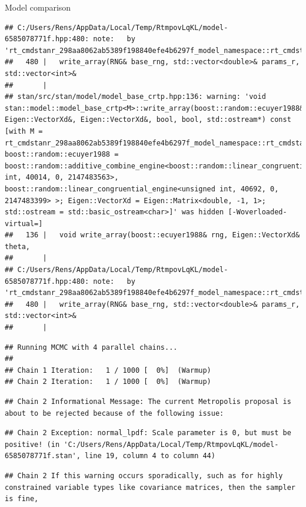 \documentclass[
  ignorenonframetext,
]{beamer}
\begin{document}
\begin{frame}[fragile]{Model comparison}
\begin{verbatim}
## C:/Users/Rens/AppData/Local/Temp/RtmpovLqKL/model-6585078771f.hpp:480: note:   by 'rt_cmdstanr_298aa8062ab5389f198840efe4b6297f_model_namespace::rt_cmdstanr_298aa8062ab5389f198840efe4b6297f_model::write_array'
##   480 |   write_array(RNG& base_rng, std::vector<double>& params_r, std::vector<int>&
##       | 
## stan/src/stan/model/model_base_crtp.hpp:136: warning: 'void stan::model::model_base_crtp<M>::write_array(boost::random::ecuyer1988&, Eigen::VectorXd&, Eigen::VectorXd&, bool, bool, std::ostream*) const [with M = rt_cmdstanr_298aa8062ab5389f198840efe4b6297f_model_namespace::rt_cmdstanr_298aa8062ab5389f198840efe4b6297f_model; boost::random::ecuyer1988 = boost::random::additive_combine_engine<boost::random::linear_congruential_engine<unsigned int, 40014, 0, 2147483563>, boost::random::linear_congruential_engine<unsigned int, 40692, 0, 2147483399> >; Eigen::VectorXd = Eigen::Matrix<double, -1, 1>; std::ostream = std::basic_ostream<char>]' was hidden [-Woverloaded-virtual=]
##   136 |   void write_array(boost::ecuyer1988& rng, Eigen::VectorXd& theta,
##       | 
## C:/Users/Rens/AppData/Local/Temp/RtmpovLqKL/model-6585078771f.hpp:480: note:   by 'rt_cmdstanr_298aa8062ab5389f198840efe4b6297f_model_namespace::rt_cmdstanr_298aa8062ab5389f198840efe4b6297f_model::write_array'
##   480 |   write_array(RNG& base_rng, std::vector<double>& params_r, std::vector<int>&
##       |
\end{verbatim}

\begin{verbatim}
## Running MCMC with 4 parallel chains...
## 
## Chain 1 Iteration:   1 / 1000 [  0%]  (Warmup) 
## Chain 2 Iteration:   1 / 1000 [  0%]  (Warmup)
\end{verbatim}

\begin{verbatim}
## Chain 2 Informational Message: The current Metropolis proposal is about to be rejected because of the following issue:
\end{verbatim}

\begin{verbatim}
## Chain 2 Exception: normal_lpdf: Scale parameter is 0, but must be positive! (in 'C:/Users/Rens/AppData/Local/Temp/RtmpovLqKL/model-6585078771f.stan', line 19, column 4 to column 44)
\end{verbatim}

\begin{verbatim}
## Chain 2 If this warning occurs sporadically, such as for highly constrained variable types like covariance matrices, then the sampler is fine,
\end{verbatim}


\end{frame}
\end{document}
